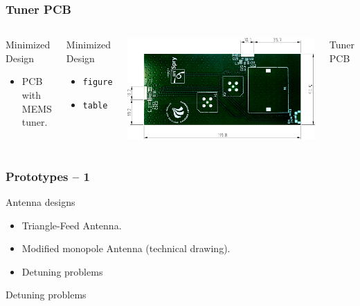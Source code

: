 \begin{frame}[fragile]
    \frametitle{Tuner PCB}
    \begin{columns}[onlytextwidth,t]
        \begin{block}{Minimized Design}
          \begin{itemize}
          \item PCB with MEMS tuner.
          \end{itemize}
        \end{block}
        \begin{block}{Minimized Design}
            \begin{itemize}
                \item \texttt{figure}
                \item \texttt{table}
            \end{itemize}
        \end{block}

        \begin{center}
            \includegraphics[scale=0.33]{img/Lasse/samanthas_board.pdf}
        \end{center}
        Tuner PCB
    \end{columns}
\end{frame}

\begin{frame}
  \frametitle{Prototypes -- 1}
  \begin{block}{Antenna designs}
      \begin{itemize}
      \item Triangle-Feed Antenna.
      \item Modified monopole Antenna (technical drawing).
      \end{itemize}
  \end{block}
  \begin{itemize}
  \item Detuning problems
  \end{itemize}
  \begin{block}{Detuning problems}
    
  \end{block}
\end{frame}

